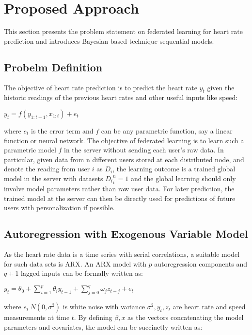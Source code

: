 \documentclass[journal,transmag]{IEEEtran}
\begin{document}
\section{Proposed Approach}

This section presents the problem statement on federated learning for heart rate prediction and introduces Bayesian-based technique sequential  models.

\subsection{Probelm Definition}

The objective of heart rate prediction is to predict the heart rate $y_t$ given the historic readings of the previous heart rates and other useful inputs like speed:

\begin{center}
  $y_t = f(y_{1:t-1} , x_{1:t}) + e_{t}$
\end{center}

where $e_t$ is the error term and $f$ can be any parametric function, say a linear function or neural network. The objective of federated learning is to learn such a parametric model $f$ in the server without sending each user’s raw data. In particular, given data from n different users stored at each distributed node, and denote the reading from user $i$ as $D_i$, the learning outcome is a trained global model in the server with datasets ${D_i}^n_i=1$ and the global learning should only involve model parameters rather than raw user data. For later prediction, the trained model at the server can then be directly used for predictions of future users with personalization if possible.

\subsection{ Autoregression with Exogenous Variable Model}

As the heart rate data is a time series with serial correlations, a suitable model for such data sets is ARX. An ARX model with $p$ autoregression components and $q + 1$ lagged inputs can be formally written as:

\begin{center}
  $y_t = \theta_0 + \sum_{i=1}^{p} \theta_i y_{t-1} + \sum_{j=0}^q \omega_j z_{t-j} + e_t$
\end{center}

where $e_t ~ N (0, \sigma^2)$ is white noise with variance $\sigma^2, y_t , z_t$ are heart rate and speed measurements at time $t$. By defining $\beta, x$ as the vectors concatenating the model parameters and covariates, the model can be succinctly written as:
\end{document}
